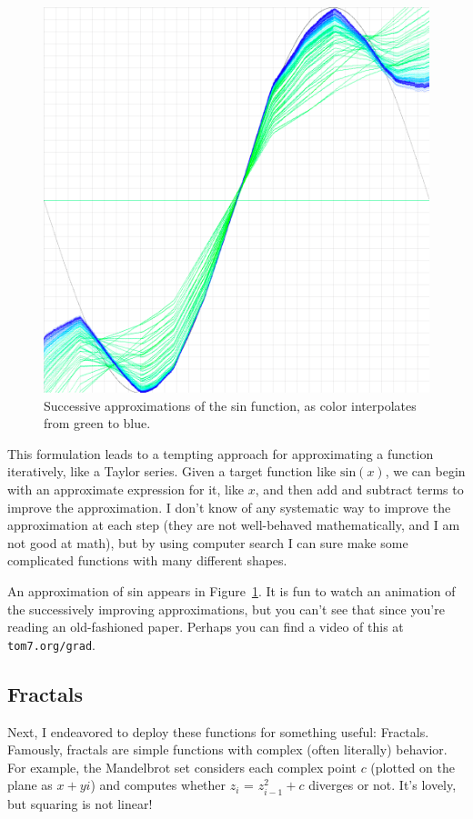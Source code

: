 \documentclass[twocolumn]{article}
\begin{document}
\begin{figure}[tp]
  \begin{center}
    \includegraphics[width=0.9 \linewidth]{sine-all}
  \end{center}
  \caption{
    Successive approximations of the {\sf sin} function, as color
    interpolates from green to blue.
  } \label{fig:sine}
\end{figure}

This formulation leads to a tempting approach for approximating a
function iteratively, like a Taylor series. Given a target function
like $\mathrm{sin}(x)$, we can begin with an approximate expression for it,
like $x$, and then add and subtract terms to improve the
approximation. I don't know of any systematic way to improve the
approximation at each step (they are not well-behaved mathematically,
and I am not good at math), but by using computer search I can sure
make some complicated functions with many different shapes.

An approximation of {\sf sin} appears in Figure~\ref{fig:sine}. It is
fun to watch an animation of the successively improving
approximations, but you can't see that since you're reading an
old-fashioned paper. Perhaps you can find a video of this at
\verb+tom7.org/grad+.

\subsection{Fractals} \label{sec:fractals}
Next, I endeavored to deploy these functions for something useful:
Fractals. Famously, fractals are simple functions with complex (often
literally) behavior. For example, the Mandelbrot set considers each
complex point $c$ (plotted on the plane as $x + yi$) and computes
whether $z_i$ = $z_{i-1}^2 + c$ diverges or not. It's lovely, but
squaring is not linear!
\end{document}
